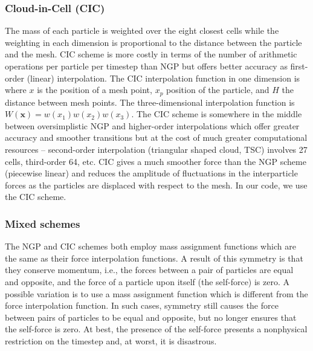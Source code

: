 \subsubsection{Cloud-in-Cell (CIC)}
The mass of each particle is weighted over the eight closest cells while the weighting in each dimension is proportional to the distance between the particle and the mesh. CIC scheme is more costly in terms of the number of arithmetic operations per particle per timestep than NGP but offers better accuracy as first-order (linear) interpolation. The CIC interpolation function in one dimension is
where $x$ is the position of a mesh point, $x_p$ position of the particle, and $H$ the distance between mesh points. The three-dimensional interpolation function is \(W(\mathbf x)=w(x_1)w(x_2)w(x_3)\). The CIC scheme is somewhere in the middle between oversimplistic NGP and higher-order interpolations which offer greater accuracy and smoother transitions but at the cost of much greater computational resources -- second-order interpolation (triangular shaped cloud, TSC) involves 27 cells, third-order 64, etc. CIC gives a much smoother force than the NGP scheme (piecewise linear) and reduces the amplitude of fluctuations in the interparticle forces as the particles are displaced with respect to the mesh. In our code, we use the CIC scheme.
\subsubsection{Mixed schemes}
The NGP and CIC schemes both employ mass assignment functions which are the same as their force interpolation functions. A result of this symmetry is that they conserve momentum, i.e., the forces between a pair of particles are equal and opposite, and the force of a particle upon itself (the self-force) is zero. A possible variation is to use a mass assignment function which is different from the force interpolation function. In such cases, symmetry still causes the force between pairs of particles to be equal and opposite, but no longer ensures that the self-force is zero. At best, the presence of the self-force presents a nonphysical restriction on the timestep and, at worst, it is disastrous.

